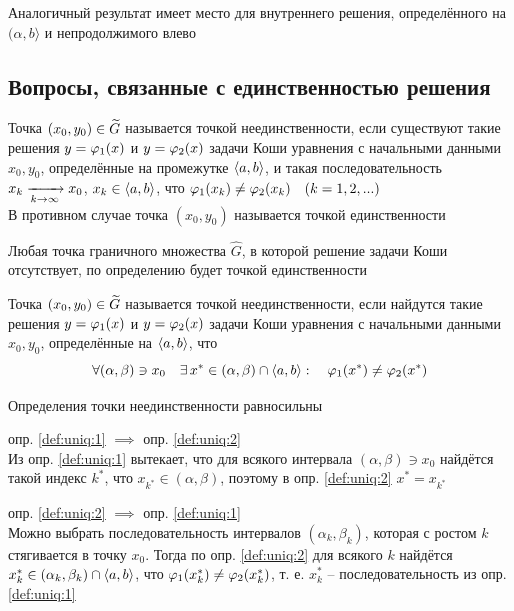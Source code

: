 Аналогичный результат имеет место для внутреннего решения, определённого на $ (\alpha, b \rangle $ и непродолжимого влево

\subsection{Вопросы, связанные с единственностью решения}

\begin{definition}\label{def:uniq:1}
    Точка $ (x_0, y_0) \in \widetilde{G} $ называется точкой неединственности, если существуют такие решения $ y = \varphi_1(x) $ и $ y = \varphi_2(x) $ задачи Коши уравнения  с начальными данными $ x_0, y_0 $, определённые на промежутке $ \Braket{a, b} $, и такая последовательность $ x_k \xrightarrow[{k} \to {\infty}]{} x_0 $, $ x_k \in \Braket{a, b} $, что $ \varphi_1(x_k) \ne \varphi_2(x_k) \quad (k = 1, 2, ...) $ \\
    В противном случае точка $ (x_0, y_0) $ называется точкой единственности
\end{definition}

\begin{remark}
    Любая точка граничного множества $ \hat{G} $, в которой решение задачи Коши отсутствует, по определению будет точкой единственности
\end{remark}

\begin{definition}\label{def:uniq:2}
    Точка $ (x_0, y_0) \in \widetilde{G} $ называется точкой неединственности, если найдутся такие решения $ y = \varphi_1(x) $ и $ y = \varphi_2(x) $ задачи Коши уравнения  с начальными данными $ x_0, y_0 $, определённые на $ \Braket{a, b} $, что
    $$ \forall (\alpha, \beta) \ni x_0 \quad \exists\, x^* \in (\alpha, \beta) \cap \Braket{a, b} : \quad \varphi_1(x^*) \ne \varphi_2(x^*) $$
\end{definition}

\begin{statement}
	Определения точки неединственности равносильны
\end{statement}

\begin{iproof}
    \item опр. \ref{def:uniq:1} $ \implies $ опр. \ref{def:uniq:2} \\
    Из опр. \ref{def:uniq:1} вытекает, что для всякого интервала $ (\alpha, \beta) \ni x_0 $ найдётся такой индекс $ k^* $, что $ x_{k^*} \in (\alpha, \beta) $, поэтому в опр. \ref{def:uniq:2} $ x^* = x_{k^*} $
    \item опр. \ref{def:uniq:2} $ \implies $ опр. \ref{def:uniq:1} \\
    Можно выбрать последовательность интервалов $ (\alpha_k, \beta_k) $, которая с ростом $ k $ стягивается в точку $ x_0 $. Тогда по опр. \ref{def:uniq:2} для всякого $ k $ найдётся $ x_k^* \in (\alpha_k, \beta_k) \cap \Braket{a, b} $, что $ \varphi_1(x_k^*) \ne \varphi_2(x_k^*) $, т. е. $ x_k^* $ -- последовательность из опр. \ref{def:uniq:1}
\end{iproof}

